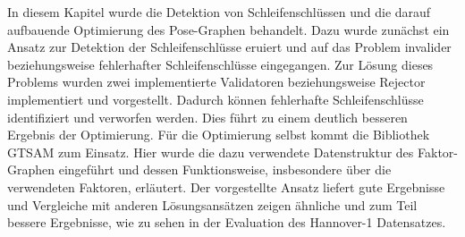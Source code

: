 In diesem Kapitel wurde die Detektion von Schleifenschlüssen und die darauf aufbauende Optimierung des Pose-Graphen behandelt. Dazu wurde zunächst ein Ansatz zur Detektion der Schleifenschlüsse eruiert und auf das Problem invalider beziehungsweise fehlerhafter Schleifenschlüsse eingegangen. Zur Lösung dieses Problems wurden zwei implementierte Validatoren beziehungsweise Rejector implementiert und vorgestellt. Dadurch können fehlerhafte Schleifenschlüsse identifiziert und verworfen werden. Dies führt zu einem deutlich besseren Ergebnis der Optimierung. Für die Optimierung selbst kommt die Bibliothek GTSAM zum Einsatz. Hier wurde die dazu verwendete Datenstruktur des Faktor-Graphen eingeführt und dessen Funktionsweise, insbesondere über die verwendeten Faktoren, erläutert. Der vorgestellte Ansatz liefert gute Ergebnisse und Vergleiche mit anderen Lösungsansätzen zeigen ähnliche und zum Teil bessere Ergebnisse, wie zu sehen in der Evaluation des Hannover-1 Datensatzes.






